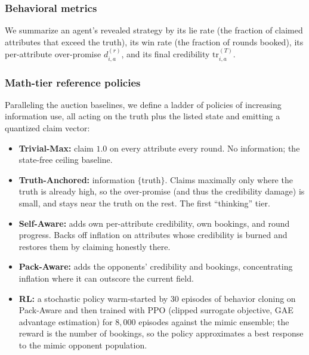 \subsubsection{Behavioral metrics}
We summarize an agent's revealed strategy by its lie rate (the fraction of claimed attributes that exceed the truth), its win rate (the fraction of rounds booked), its per-attribute over-promise $d_{i,a}^{(r)}$, and its final credibility $\mathrm{tr}_{i,a}^{(T)}$.

\subsubsection{Math-tier reference policies}
\label{sec:dec5-tiers}
Paralleling the auction baselines, we define a ladder of policies of increasing information use, all acting on the truth plus the listed state and emitting a quantized claim vector:
\begin{itemize}
\item \textbf{Trivial-Max:} claim $1.0$ on every attribute every round. No information; the state-free ceiling baseline.
\item \textbf{Truth-Anchored:} information $\{$truth$\}$. Claims maximally only where the truth is already high, so the over-promise (and thus the credibility damage) is small, and stays near the truth on the rest. The first ``thinking'' tier.
\item \textbf{Self-Aware:} adds own per-attribute credibility, own bookings, and round progress. Backs off inflation on attributes whose credibility is burned and restores them by claiming honestly there.
\item \textbf{Pack-Aware:} adds the opponents' credibility and bookings, concentrating inflation where it can outscore the current field.
\item \textbf{RL:} a stochastic policy warm-started by $30$ episodes of behavior cloning on Pack-Aware and then trained with PPO (clipped surrogate objective, GAE advantage estimation) for $8{,}000$ episodes against the mimic ensemble; the reward is the number of bookings, so the policy approximates a best response to the mimic opponent population.
\end{itemize}

